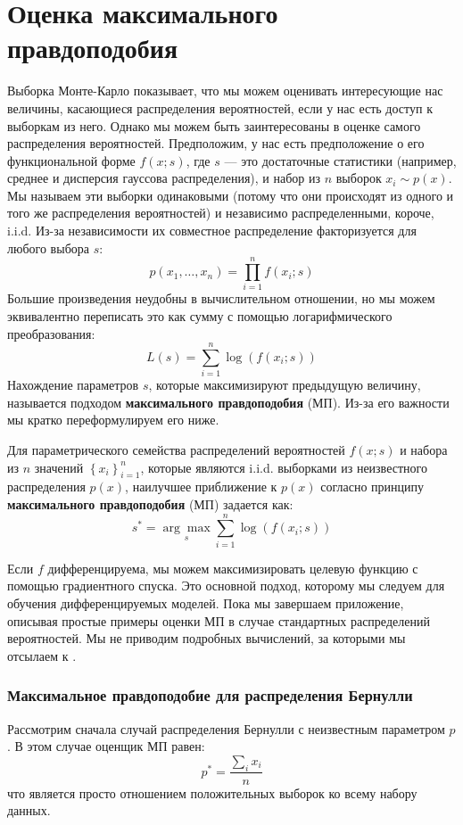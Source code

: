 \section{Оценка максимального правдоподобия} \addclock
\label{sec:maximum_likelihood_estimation}

Выборка Монте-Карло показывает, что мы можем оценивать интересующие нас величины, касающиеся распределения вероятностей, если у нас есть доступ к выборкам из него. Однако мы можем быть заинтересованы в оценке самого распределения вероятностей. Предположим, у нас есть предположение о его функциональной форме $f(x; s)$, где $s$ — это достаточные статистики (например, среднее и дисперсия гауссова распределения), и набор из $n$ выборок $x_i \sim p(x)$. Мы называем эти выборки одинаковыми (потому что они происходят из одного и того же распределения вероятностей) и независимо распределенными, короче, i.i.d. Из-за независимости их совместное распределение факторизуется для любого выбора $s$:
%
$$
p(x_1, \ldots, x_n)=\prod_{i=1}^n f(x_i; s)
$$
%
Большие произведения неудобны в вычислительном отношении, но мы можем эквивалентно переписать это как сумму с помощью логарифмического преобразования:
%
$$
L(s)= \sum_{i=1}^n\log(f(x_i;s))
$$
%
Нахождение параметров $s$, которые максимизируют предыдущую величину, называется подходом \textbf{максимального правдоподобия} (МП). Из-за его важности мы кратко переформулируем его ниже.

\newpage
\begin{definition} \addbottle
Для параметрического семейства распределений вероятностей $f(x; s)$ и набора из $n$ значений $\left\{x_i\right\}_{i=1}^n$, которые являются i.i.d. выборками из неизвестного распределения $p(x)$, наилучшее приближение к $p(x)$ согласно принципу \textbf{максимального правдоподобия} (МП) задается как:
%
$$
s^*=\underset{s}{\arg\max} \sum_{i=1}^n \log(f(x_i;s))
$$
\end{definition}

Если $f$ дифференцируема, мы можем максимизировать целевую функцию с помощью градиентного спуска. Это основной подход, которому мы следуем для обучения дифференцируемых моделей. Пока мы завершаем приложение, описывая простые примеры оценки МП в случае стандартных распределений вероятностей. Мы не приводим подробных вычислений, за которыми мы отсылаем к \cite{bishop2006pattern,bishop2024deep}.
%
\subsubsection*{Максимальное правдоподобие для распределения Бернулли}
%
Рассмотрим сначала случай распределения Бернулли с неизвестным параметром $p$. В этом случае оценщик МП равен:
%
$$
p^*=\frac{\sum_i x_i}{n}
$$
%
что является просто отношением положительных выборок ко всему набору данных.

